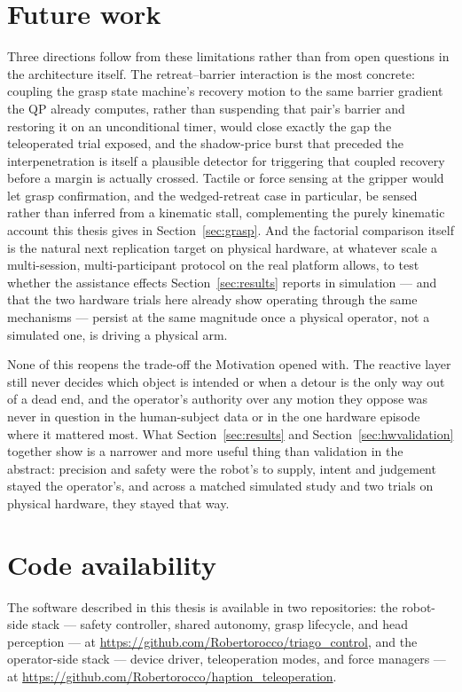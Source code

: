 \documentclass[12pt,a4paper,twoside,openright]{report}
\begin{document}
\section{Future work}
\label{sec:conclfuture}

Three directions follow from these limitations rather than from open questions in the architecture itself. The retreat--barrier interaction is the most concrete: coupling the grasp state machine's recovery motion to the same barrier gradient the QP already computes, rather than suspending that pair's barrier and restoring it on an unconditional timer, would close exactly the gap the teleoperated trial exposed, and the shadow-price burst that preceded the interpenetration is itself a plausible detector for triggering that coupled recovery before a margin is actually crossed. Tactile or force sensing at the gripper would let grasp confirmation, and the wedged-retreat case in particular, be sensed rather than inferred from a kinematic stall, complementing the purely kinematic account this thesis gives in Section~\ref{sec:grasp}. And the factorial comparison itself is the natural next replication target on physical hardware, at whatever scale a multi-session, multi-participant protocol on the real platform allows, to test whether the assistance effects Section~\ref{sec:results} reports in simulation --- and that the two hardware trials here already show operating through the same mechanisms --- persist at the same magnitude once a physical operator, not a simulated one, is driving a physical arm.

None of this reopens the trade-off the Motivation opened with. The reactive layer still never decides which object is intended or when a detour is the only way out of a dead end, and the operator's authority over any motion they oppose was never in question in the human-subject data or in the one hardware episode where it mattered most. What Section~\ref{sec:results} and Section~\ref{sec:hwvalidation} together show is a narrower and more useful thing than validation in the abstract: precision and safety were the robot's to supply, intent and judgement stayed the operator's, and across a matched simulated study and two trials on physical hardware, they stayed that way.

\section*{Code availability}
The software described in this thesis is available in two repositories: the robot-side stack --- safety controller, shared autonomy, grasp lifecycle, and head perception --- at \url{https://github.com/Robertorocco/triago_control}, and the operator-side stack --- device driver, teleoperation modes, and force managers --- at \url{https://github.com/Robertorocco/haption_teleoperation}.
\end{document}
